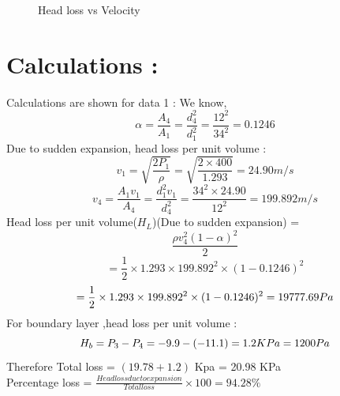 \documentclass[12pt,a4paper]{article}
\begin{document}
\begin{figure}[!ht]
	\begin{center}
	\end{center}
	\caption{Head loss vs Velocity}
\end{figure}
\newpage
\section{Calculations :}
Calculations are shown for data 1 :
We know,
\begin{equation}
   \alpha = \frac{A_4}{A_1} = \frac{d_4^{2}}{d_1^{2}} = \frac{12^{2}}{34^{2}} = 0.1246
\end{equation}
Due to sudden expansion, head loss per unit volume :
\begin{equation}
    v_1 = \sqrt{\frac{2P_1}{\rho}} = \sqrt{\frac{2\times 400}{1.293}} = 24.90 m/s
\end{equation}
\begin{equation}
    v_4 = \frac{A_1 v_1}{A_4} = \frac{d_1^{2}v_1}{d_4^{2}} = \frac{34^{2} \times 24.90}{12^{2}} = 199.892 m/s
\end{equation}
Head loss per unit volume($H_L$)(Due to sudden expansion) = \begin{equation}
\frac{\rho v_4^{2} (1-\alpha)^{2}}{2}
\end{equation}
\begin{equation}
= \frac{1}{2} \times 1.293 \times 199.892^{2}\times (1-0.1246)^{2}  
\end{equation}
\begin{equation}
= \frac{1}{2} \times 1.293 \times 199.892^{2}\times (1-0.1246)^{2} = 19777.69 Pa\\
\end{equation}
For boundary layer ,head loss per unit volume :
\begin{equation}
    H_b = P_3 - P_4 = -9.9-(-11.1) = 1.2 KPa = 1200 Pa\\
\end{equation}
    Therefore Total loss = $(19.78+1.2)$ Kpa = 20.98 KPa\\
 Percentage loss = $\frac{Headloss due to expansion}{Total loss} \times 100 = 94.28\%$
\end{document}
